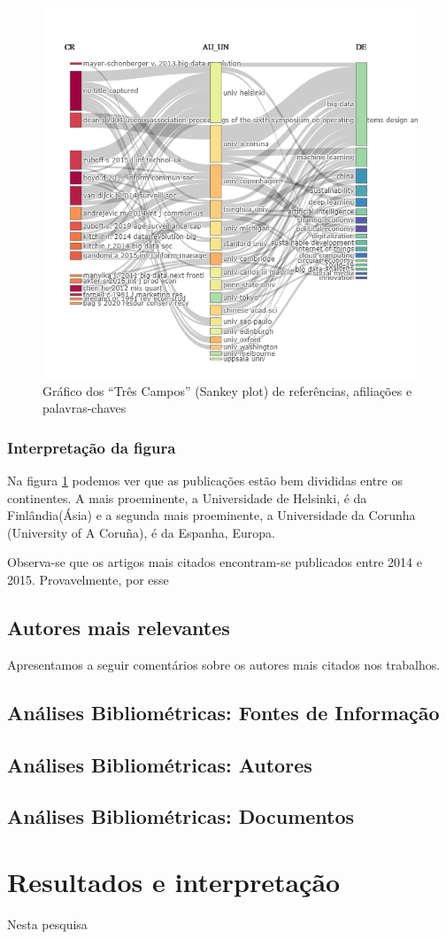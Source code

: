 \begin{figure}[ht]
    \centering
    \includegraphics[width=12cm]{experiments/Tong00020/PesquisaBibliometrica/DataSet/MASSA@Tong00020-Three Fields Plot Affiliations References Keywords.png}
    \caption{Gráfico dos “Três Campos” (Sankey plot) de referências, afiliações e palavras-chaves}
    \label{fig:g-tres}
\end{figure}

\subsubsection{Interpretação da figura}
Na figura \ref{fig:g-tres} podemos ver que as publicações estão bem divididas entre os continentes. A mais proeminente, a Universidade de Helsinki, é da Finlândia(Ásia) e a segunda mais proeminente, a Universidade da Corunha (University of A Coruña), é da Espanha, Europa.

Observa-se que os artigos mais citados encontram-se publicados entre 2014 e 2015. Provavelmente, por esse 



\subsection{Autores mais relevantes}
Apresentamos a seguir comentários sobre os autores mais citados nos trabalhos.

\subsection{Análises Bibliométricas: Fontes de Informação}

\subsection{Análises Bibliométricas: Autores}

\subsection{Análises Bibliométricas: Documentos}



\section{Resultados e interpretação}
Nesta pesquisa 